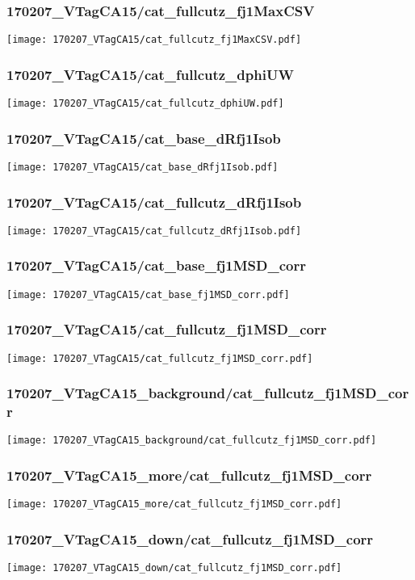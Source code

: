 \begin{frame}
   \frametitle{\small 170207\_VTagCA15/cat\_fullcutz\_fj1MaxCSV}
   \centering
   \texttt{[image: 170207\_VTagCA15/cat\_fullcutz\_fj1MaxCSV.pdf]}
\end{frame}

\begin{frame}
   \frametitle{\small 170207\_VTagCA15/cat\_fullcutz\_dphiUW}
   \centering
   \texttt{[image: 170207\_VTagCA15/cat\_fullcutz\_dphiUW.pdf]}
\end{frame}

\begin{frame}
   \frametitle{\small 170207\_VTagCA15/cat\_base\_dRfj1Isob}
   \centering
   \texttt{[image: 170207\_VTagCA15/cat\_base\_dRfj1Isob.pdf]}
\end{frame}

\begin{frame}
   \frametitle{\small 170207\_VTagCA15/cat\_fullcutz\_dRfj1Isob}
   \centering
   \texttt{[image: 170207\_VTagCA15/cat\_fullcutz\_dRfj1Isob.pdf]}
\end{frame}

\begin{frame}
   \frametitle{\small 170207\_VTagCA15/cat\_base\_fj1MSD\_corr}
   \centering
   \texttt{[image: 170207\_VTagCA15/cat\_base\_fj1MSD\_corr.pdf]}
\end{frame}

\begin{frame}
   \frametitle{\small 170207\_VTagCA15/cat\_fullcutz\_fj1MSD\_corr}
   \centering
   \texttt{[image: 170207\_VTagCA15/cat\_fullcutz\_fj1MSD\_corr.pdf]}
\end{frame}

\begin{frame}
   \frametitle{\small 170207\_VTagCA15\_background/cat\_fullcutz\_fj1MSD\_corr}
   \centering
   \texttt{[image: 170207\_VTagCA15\_background/cat\_fullcutz\_fj1MSD\_corr.pdf]}
\end{frame}

\begin{frame}
   \frametitle{\small 170207\_VTagCA15\_more/cat\_fullcutz\_fj1MSD\_corr}
   \centering
   \texttt{[image: 170207\_VTagCA15\_more/cat\_fullcutz\_fj1MSD\_corr.pdf]}
\end{frame}

\begin{frame}
   \frametitle{\small 170207\_VTagCA15\_down/cat\_fullcutz\_fj1MSD\_corr}
   \centering
   \texttt{[image: 170207\_VTagCA15\_down/cat\_fullcutz\_fj1MSD\_corr.pdf]}
\end{frame}

